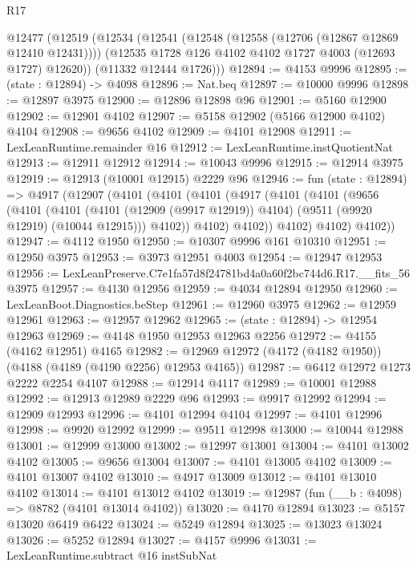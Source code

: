\begin{lexlean}{R17}
\begin{coremodule}
  @12477
    (@12519
      (@12534
        (@12541
          (@12548 (@12558 (@12706 (@12867 @12869 @12410 @12431))))
          (@12535 @1728 @126 @4102 @4102 @1727 @4003 (@12693 @1727) @12620))
        (@11332 @12444 @1726)))
@12894 := @4153 @9996
@12895 := (state : @12894) -> @4098
@12896 := Nat.beq
@12897 := @10000 @9996
@12898 := @12897 @3975
@12900 := @12896 @12898 @96
@12901 := @5160 @12900
@12902 := @12901 @4102
@12907 := @5158 @12902 (@5166 @12900 @4102) @4104
@12908 := @9656 @4102
@12909 := @4101 @12908
@12911 := LexLeanRuntime.remainder @16
@12912 := LexLeanRuntime.instQuotientNat
@12913 := @12911 @12912
@12914 := @10043 @9996
@12915 := @12914 @3975
@12919 := @12913 (@10001 @12915) @2229 @96
@12946 := fun (state : @12894) =>
  @4917
    (@12907
      (@4101
        (@4101
          (@4101
            (@4917
              (@4101
                (@4101
                  (@9656
                    (@4101
                      (@4101
                        (@4101 (@12909 (@9917 @12919)) @4104)
                        (@9511 (@9920 @12919) (@10044 @12915)))
                      @4102))
                  @4102)
                @4102))
            @4102)
          @4102)
        @4102))
@12947 := @4112 @1950
@12950 := @10307 @9996 @161 @10310
@12951 := @12950 @3975
@12953 := @3973 @12951 @4003
@12954 := @12947 @12953
@12956 := LexLeanPreserve.C7e1fa57d8f24781bd4a0a60f2bc744d6.R17.__fits_56 @3975
@12957 := @4130 @12956
@12959 := @4034 @12894 @12950
@12960 := LexLeanBoot.Diagnostics.beStep
@12961 := @12960 @3975
@12962 := @12959 @12961
@12963 := @12957 @12962
@12965 := (state : @12894) -> @12954 @12963
@12969 := @4148 @1950 @12953 @12963 @2256
@12972 := @4155 (@4162 @12951) @4165
@12982 := @12969 @12972 (@4172 (@4182 @1950)) (@4188 (@4189 (@4190 @2256) @12953 @4165))
@12987 := @6412 @12972 @1273 @2222 @2254 @4107
@12988 := @12914 @4117
@12989 := @10001 @12988
@12992 := @12913 @12989 @2229 @96
@12993 := @9917 @12992
@12994 := @12909 @12993
@12996 := @4101 @12994 @4104
@12997 := @4101 @12996
@12998 := @9920 @12992
@12999 := @9511 @12998
@13000 := @10044 @12988
@13001 := @12999 @13000
@13002 := @12997 @13001
@13004 := @4101 @13002 @4102
@13005 := @9656 @13004
@13007 := @4101 @13005 @4102
@13009 := @4101 @13007 @4102
@13010 := @4917 @13009
@13012 := @4101 @13010 @4102
@13014 := @4101 @13012 @4102
@13019 := @12987 (fun (__b : @4098) => @8782 (@4101 @13014 @4102))
@13020 := @4170 @12894
@13023 := @5157 @13020 @6419 @6422
@13024 := @5249 @12894
@13025 := @13023 @13024
@13026 := @5252 @12894
@13027 := @4157 @9996
@13031 := LexLeanRuntime.subtract @16 instSubNat

\end{coremodule}
\end{lexlean}
